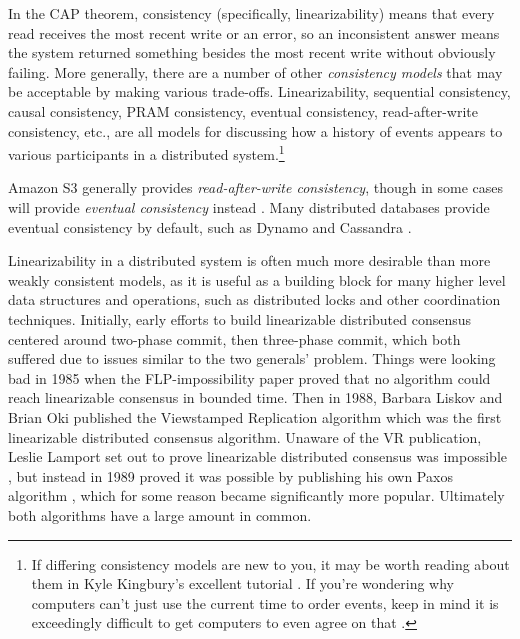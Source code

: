 \documentclass[11pt,fleqn,openany]{book}
\begin{document}
In the CAP theorem, consistency (specifically, linearizability) means that
every read receives the most recent write or an error, so an inconsistent
answer means the system returned something besides the most recent write
without obviously failing.
More generally, there
are a number of other {\em consistency models} that may be acceptable by making
various trade-offs. Linearizability, sequential consistency, causal consistency,
PRAM consistency, eventual consistency, read-after-write consistency, etc., are
all models for discussing how a history of events appears to various
participants in a distributed system.\footnote{If differing consistency models
are new to you, it may be worth reading about them in Kyle Kingbury's excellent
tutorial \cite{aphyr-consistency}. If you're wondering why computers can't just
use the current time to order events, keep in mind it is exceedingly difficult
to get computers to even agree on that \cite{no-now}.}

Amazon S3 generally provides {\em read-after-write consistency}, though in some
cases will provide {\em eventual consistency} instead \cite{s3-consistency}.
Many distributed databases provide eventual consistency by
default, such as Dynamo \cite{dynamo} and Cassandra \cite{cassandra}.

Linearizability in a distributed system is often much more desirable than more
weakly consistent models, as it is
useful as a building block for many higher level data structures and operations,
such as distributed locks and other coordination techniques. Initially, early
efforts to build linearizable distributed consensus centered around two-phase
commit, then three-phase commit, which both
suffered due to issues similar to the two generals' problem. Things were looking
bad in 1985 when the FLP-impossibility paper \cite{flp} proved that no algorithm
could reach linearizable consensus in bounded time. Then in 1988, Barbara Liskov
and Brian Oki published the Viewstamped Replication algorithm \cite{vr} which
was the first linearizable distributed consensus algorithm. Unaware of the VR
publication, Leslie Lamport set out to prove linearizable distributed consensus
was impossible \cite{paxos-note}, but instead in 1989 proved it was possible by
publishing his own Paxos algorithm \cite{paxos}, which for some reason became
significantly more popular. Ultimately both algorithms have a large amount in
common.
\end{document}
